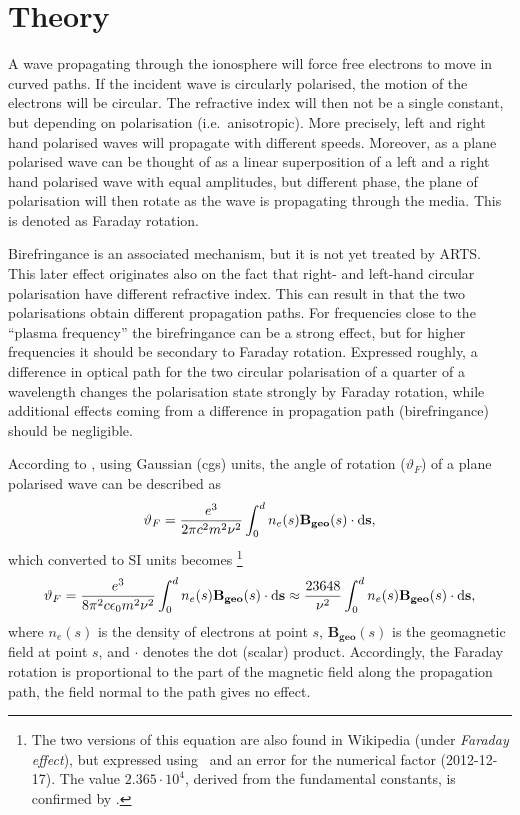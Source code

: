 \section{Theory}
\label{sec:faraday:theory}

A wave propagating through the ionosphere will force free electrons to move in
curved paths. If the incident wave is circularly polarised, the motion of the
electrons will be circular. The refractive index will then not be a single
constant, but depending on polarisation (i.e.\ anisotropic). More precisely,
left and right hand polarised waves will propagate with different speeds.
Moreover, as a plane polarised wave can be thought of as a linear superposition
of a left and a right hand polarised wave with equal amplitudes, but different
phase, the plane of polarisation will then rotate as the wave is propagating
through the media. This is denoted as Faraday rotation.

Birefringance  is an associated mechanism, but it is not
yet treated by ARTS. This later effect originates also on the fact that right-
and left-hand circular polarisation have different refractive index. This can
result in that the two polarisations obtain different propagation paths. For
frequencies close to the ``plasma frequency'' the birefringance can be a strong
effect, but for higher frequencies it should be secondary to Faraday rotation.
Expressed roughly, a difference in optical path for the two circular
polarisation of a quarter of a wavelength changes the polarisation state
strongly by Faraday rotation, while additional effects coming from a difference
in propagation path (birefringance) should be negligible.

According to \citet{rybicki:radia:79}, using Gaussian (cgs) units, the angle of
rotation (\(\vartheta_{F}\)) of a plane polarised wave can be described as
\begin{displaymath}
\vartheta_{F}=
\frac{e^{3}}{2\pi c^2 m^{2}\nu^{2}}
\int_{0}^{d}n_{e}(s) {\bf B_{geo}} (s) \cdot  {\bf \ensuremath{\mathrm{d}}s},  
\end{displaymath}
which converted to SI units becomes \citep{kraus:66}\footnote{The two versions
  of this equation are also found in Wikipedia (under \emph{Faraday effect}),
  but expressed using \Wvl\ and an error for the numerical factor
  (2012-12-17). The value $2.365\cdot10^4$, derived from the fundamental
  constants, is confirmed by \citet{wright:03}.}
\begin{equation}
\vartheta_{F}=\frac{e^{3}}{8\pi^2 c\epsilon_{0}m^{2}\nu^{2}}
\int_{0}^{d}n_{e}(s) {\bf B_{geo}} (s) \cdot  {\bf \ensuremath{\mathrm{d}}s} \approx
\frac{23648}{\nu^2} \int_{0}^{d}n_{e}(s) {\bf B_{geo}} (s) \cdot  {\bf \ensuremath{\mathrm{d}}s},
\end{equation}
where \(n_{e}(s)\) is the density of electrons at point \(s\),
\(\mathbf{B_{geo}}(s)\) is the geomagnetic field at point \(s\), and \(\cdot\)
denotes the dot (scalar) product. Accordingly, the Faraday rotation is
proportional to the part of the magnetic field along the propagation path,
the field normal to the path gives no effect.

